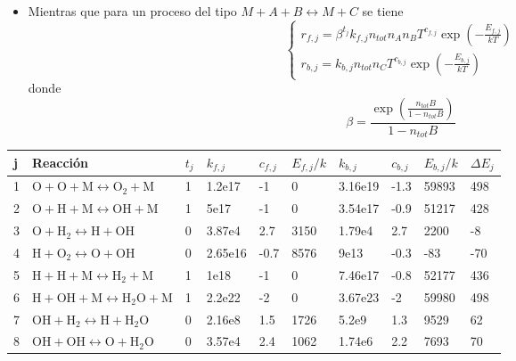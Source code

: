 \documentclass[aps,prb,onecolumn,superscriptaddress,floatfix,longbibliography,10pt]{revtex4-2}
\newif\ifptitle
\newif\ifpnumber
\newcounter{para}
\newcommand\ptitle[1]{\par\refstepcounter{para}
{\ifpnumber{\noindent\textcolor{lightgray}{\textbf{\thepara}}\indent}\fi}
{\ifptitle{\textbf{[{#1}]}}\fi}}
\begin{document}
\ptitle{Velocidad de reacción para $M + A + B \leftrightarrow  M + C$}
\begin{itemize}
   \item Mientras que para un proceso del tipo $M + A + B \leftrightarrow  M + C$ se tiene 
   \[
   \left\{\begin{matrix}
    r_{f,j} = \beta^{t_j} k_{f,j} n_{tot} n_A n_B T^{c_{f,j}} \exp{(-\frac{E_{f,j}}{k T})} \\
    r_{b,j} = k_{b,j} n_{tot} n_C T^{c_{b,j}} \exp{(-\frac{E_{b,j}}{k T})}
    \end{matrix}\right.
   \]
   donde
   \[\beta  = \frac{\exp{ \left (  \frac{n_{tot} B}{1 - n_{tot} B}  \right )   }  }{1 - n_{tot} B} \]

\end{itemize}


\begin{table}[]
  \centering
  \begin{tabular}{llllllllll}
    \hline
    \multicolumn{1}{|l|}{j} &
    \multicolumn{1}{l|}{Reacción} &
    \multicolumn{1}{l|}{$t_j$} &
    \multicolumn{1}{l|}{$k_{f,j}$} &
    \multicolumn{1}{l|}{$c_{f,j}$} &
    \multicolumn{1}{l|}{$E_{f,j}/k$} &
    \multicolumn{1}{l|}{$k_{b,j}$} &
    \multicolumn{1}{l|}{$c_{b,j}$} &
    \multicolumn{1}{l|}{$E_{b,j}/k$} &
    \multicolumn{1}{l|}{$\Delta E_j$} \\ \hline
  1  & $\mathrm{O + O + M \leftrightarrow O_2 + M} $ &1      &1.2e17           &-1  &0  &3.16e19  &-1.3 &59893  & 498 \\
  2  & $\mathrm{O + H + M  \leftrightarrow OH + M} $ &1      &5e17           &-1  &0  &3.54e17  &-0.9  &51217 & 428\\
  3  & $\mathrm{O + H_2  \leftrightarrow H + OH} $ &0       &3.87e4           &2.7  &3150  &1.79e4  &2.7  &2200  &-8  \\
  4  & $\mathrm{H + O_2  \leftrightarrow O + OH} $ &0       &2.65e16           &-0.7  &8576  &9e13  &-0.3  &-83  &-70  \\
  5  & $\mathrm{H + H + M  \leftrightarrow H_2 + M} $ &1       &1e18           & -1  &0  &7.46e17  &-0.8  &52177 &436 \\
  6  & $\mathrm{H + OH + M  \leftrightarrow H_2O + M} $ &1       &2.2e22           &-2  &0  &3.67e23  &-2  &59980  &498  \\
  7  & $\mathrm{ OH + H_2  \leftrightarrow H + H_2O} $ &0       &2.16e8           &1.5  &1726  &5.2e9  &1.3  &9529  &62  \\
  8  & $\mathrm{ OH + OH \leftrightarrow O + H_2O} $ &0       &3.57e4           &2.4  &1062  &1.74e6  &2.2  &7693  &70 \\

\end{tabular}
\end{table}
\end{document}
